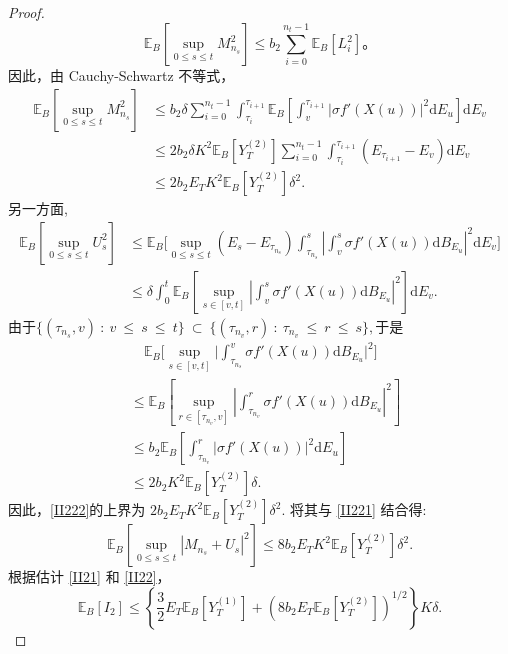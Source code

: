 \begin{proof}
	$$
	\mathbb{E}_B \left[\sup_{0 \leq s \leq t} M_{n_s}^2\right] \leq b_2 \sum_{i=0}^{n_t-1} \mathbb{E}_B [L_i^2]。
	$$
	因此，由 Cauchy-Schwartz 不等式，
	\begin{align}
		\mathbb{E}_B\left[\sup_{0\leq s\leq t}M_{n_s}^2\right] 
		&\leq b_2\delta\sum_{i=0}^{n_t-1}\int_{\tau_i}^{\tau_{i+1}}\mathbb{E}_B
		\left[\int_{v}^{\tau_{i+1}}\left|\sigma f'(X(u))\right|^2\mathrm{d}E_{u}\right]
		\mathrm{d}E_{v} \nonumber \\
		&\leq2b_2\delta K^2\mathbb{E}_B[Y_T^{(2)}]\sum_{i=0}^{n_t-1}\int_{\tau_i}^
		{\tau_{i+1}}(E_{\tau_{i+1}}-E_{v})\mathrm{d}E_{v} \nonumber \\
		&\leq 2b_2E_TK^2\mathbb{E}_B[Y_T^{(2)}]\delta^2. \label{II221}
	\end{align}
	另一方面, 
	\begin{align}
		\mathbb{E}_B\left[\sup_{0\leq s\leq t}U_s^2\right]  
		&\leq\mathbb{E}_B\biggl[\sup_{0\leq s\leq t}(E_s-E_{\tau_{n_s}})\int_{\tau_{n_s}}^s\left|\int_v^s\sigma f'(X(u))\mathrm{d}B_{E_{u}}\right|^2\mathrm{d}E_{v}\biggr] \nonumber \\ &\leq\delta\int_0^t\mathbb{E}_B\left[\sup_{s\in[v,t]}\left|\int_v^s\sigma f'(X(u))\mathrm{d}B_{E_{u}}\right|^2\right]\mathrm{d}E_{v}.\label{II222}
	\end{align}
	由于$\{(\tau_{n_s},v)~:~v~\leq~s~\leq~t\}~\subset~\{(\tau_{n_{v}},r)~:~\tau_{n_{v}}~\leq~r~\leq~s\},$于是
	\begin{align*}
		&\quad\mathbb{E}_B\Big[\sup_{s\in[v,t]}\Big|\int_{\tau_{n_{s}}}^{v}\sigma f'(X(u))\mathrm{d}B_{E_{u}}\Big|^2\Big]  \\
		&\le \mathbb{E}_B\left[\sup_{r\in[\tau_{n_{v}},v]}\left|\int_{\tau_{n_{v}}}^r\sigma f'(X(u))\mathrm{d}B_{E_{u}}\right|^2\right] \\
		&\leq b_2\mathbb{E}_B\left[\int_{\tau_{n_{v}}}^{r}\left|\sigma f'(X(u))\right|^2\mathrm{d}E_{u}\right]\\
		&\leq 2b_2K^2\mathbb{E}_B[Y_T^{(2)}]\delta.
	\end{align*}
	因此，\cref{II222}的上界为  $2b_2E_TK^2\mathbb{E}_B[Y_T^{(2)}]\delta^2.$ 将其与 \cref{II221} 结合得:
	\begin{equation}\label{II22}
		\mathbb{E}_B\left[\sup_{0\leq s\leq t}|M_{n_s}+U_s|^2\right] 
		\leq 8b_2E_TK^2\mathbb{E}_B[Y_T^{(2)}]\delta^2. 
	\end{equation}
	根据估计 \cref{II21} 和 \cref{II22}，
	\begin{equation}\label{II2}
		\mathbb{E}_B[I_2] 
		\leq \left\{\frac{3}{2}E_T\mathbb{E}_B[Y_T^{(1)}]+(8b_2E_T\mathbb{E}_B[Y_T^{(2)}])^{1/2}\right\}K\delta. 
	\end{equation}
	

\end{proof}
